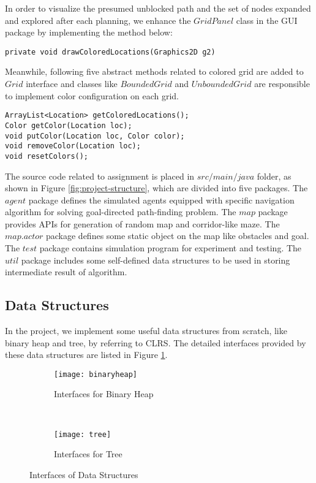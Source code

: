 In order to visualize the presumed unblocked path and the set of nodes expanded
and explored after each planning, we enhance the $GridPanel$ class in the 
GUI package by implementing the method below:

\begin{lstlisting}
private void drawColoredLocations(Graphics2D g2)
\end{lstlisting}

Meanwhile, following five abstract methods related to colored grid are added 
to $Grid$ interface and classes like $BoundedGrid$ and $UnboundedGrid$ are 
responsible to implement color configuration on each grid.

\begin{lstlisting}
ArrayList<Location> getColoredLocations();
Color getColor(Location loc);
void putColor(Location loc, Color color);
void removeColor(Location loc);
void resetColors();
\end{lstlisting}

The source code related to assignment is placed in $src/main/java$ folder, as 
shown in Figure \ref{fig:project-structure}, which are divided into five packages.
The $agent$ package defines the simulated agents equipped with specific navigation 
algorithm for solving goal-directed path-finding problem. The $map$ package 
provides APIs for generation of random map and corridor-like maze. The $map.actor$ 
package defines some static object on the map like obstacles and goal. The $test$
package contains simulation program for experiment and testing. The $util$
package includes some self-defined data structures to be used in storing 
intermediate result of algorithm.

\subsection{Data Structures}

In the project, we implement some useful data structures from scratch, like
binary heap and tree, by referring to CLRS\cite{clrs}. The detailed interfaces
provided by these data structures are listed in Figure \ref{fig:ds}.

\begin{figure}[ht!]
  \centering
  \begin{subfigure}[b]{0.45\textwidth}
    \texttt{[image: binaryheap]}
    \caption{Interfaces for Binary Heap}
  \end{subfigure}
  ~
  \begin{subfigure}[b]{0.45\textwidth}
    \texttt{[image: tree]}
    \caption{Interfaces for Tree}
  \end{subfigure}
\caption{Interfaces of Data Structures}
\label{fig:ds}
\end{figure}

